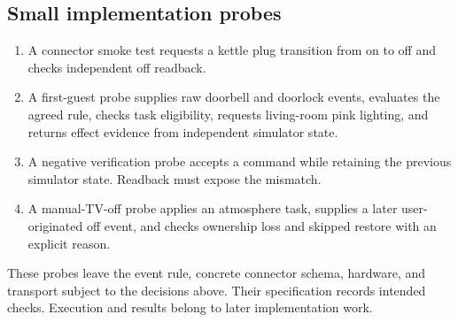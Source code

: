 \subsection{Small implementation probes}


\begin{enumerate}
\item A connector smoke test requests a kettle plug transition from on to off and checks independent off readback.
\item A first-guest probe supplies raw doorbell and doorlock events, evaluates the agreed rule, checks task eligibility, requests living-room pink lighting, and returns effect evidence from independent simulator state.
\item A negative verification probe accepts a command while retaining the previous simulator state. Readback must expose the mismatch.
\item A manual-TV-off probe applies an atmosphere task, supplies a later user-originated off event, and checks ownership loss and skipped restore with an explicit reason.
\end{enumerate}

These probes leave the event rule, concrete connector schema, hardware, and transport subject to the decisions above. Their specification records intended checks. Execution and results belong to later implementation work. 
